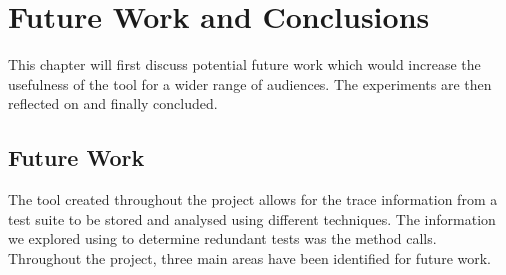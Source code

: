 \chapter{Future Work and Conclusions}\label{C:future}

This chapter will first discuss potential future work which would increase the usefulness of the tool for a wider range of audiences. The experiments are then reflected on and finally concluded. 

\section{Future Work}
The tool created throughout the project allows for the trace information from a test suite to be stored and analysed using different techniques. The information we explored using to determine redundant tests was the method calls. Throughout the project, three main areas have been identified for future work.

